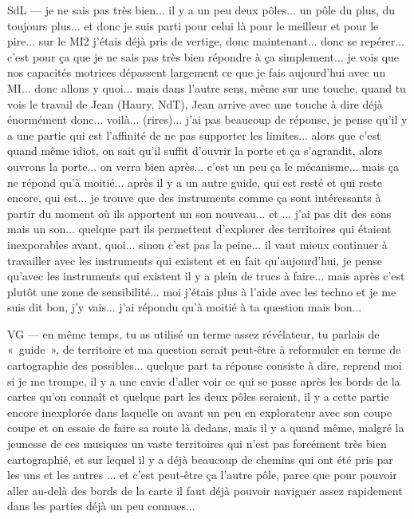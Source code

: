 SdL — je ne sais pas très bien... il y a un peu deux pôles... un pôle du plus, du toujours plus... et donc je suis parti pour celui là pour le meilleur et pour le pire... sur le MI2 j'étais déjà pris de vertige, donc maintenant... donc se repérer...  c'est pour ça que je ne sais pas très bien répondre à ça simplement... je vois que nos capacités motrices dépassent largement ce que je fais aujourd'hui avec un MI... donc allons y quoi... mais dans l'autre sens, même sur une touche, quand tu vois le travail de Jean (Haury, NdT), Jean arrive avec une touche à dire déjà énormément donc... voilà... (rires)... j'ai pas beaucoup de réponse, je pense qu'il y a une partie qui est l'affinité de ne pas supporter les limites... alors que c'est quand même idiot, on sait qu'il suffit d'ouvrir la porte et ça s'agrandit, alors ouvrons la porte... on verra bien après... c'est un peu ça le mécanisme... mais ça ne répond qu'à moitié... après il y a un autre guide, qui est resté et qui reste encore, qui est... je trouve que des instruments comme ça sont intéressants à partir du moment où ils apportent un son nouveau... et ... j'ai pas dit des sons mais un son... quelque part ils permettent d'explorer des territoires qui étaient inexporables avant, quoi... sinon c'est pas la peine... il vaut mieux continuer à travailler avec les instruments qui existent et en fait qu'aujourd'hui, je pense qu'avec les instruments qui existent il y a plein de trucs à faire... mais après c'est plutôt une zone de sensibilité... moi j'étais plus à l'aide avec les techno et je me suis dit bon, j'y vais... j'ai répondu qu'à moitié à ta question mais bon... 

VG — en même temps, tu as utilisé un terme assez révélateur, tu parlais de « guide », de territoire et ma question serait peut-être à reformuler en terme de cartographie des possibles... quelque part ta réponse consiste à dire, reprend moi si je me trompe, il y a une envie d'aller voir ce qui se passe après les bords de la cartes qu'on connaît et quelque part les deux pôles seraient, il y a cette partie encore inexplorée dans laquelle on avant un peu en explorateur avec son coupe coupe et on essaie de faire sa route là dedans, mais il y a quand même, malgré la jeunesse de ces musiques un vaste territoires qui n'est pas forcément très bien cartographié, et sur lequel il y a déjà beaucoup de chemins qui ont été pris par les uns et les autres ... et c'est peut-être ça l'autre pôle, parce que pour pouvoir aller au-delà des bords de la carte il faut déjà pouvoir naviguer assez rapidement dans les parties déjà un peu connues... 

